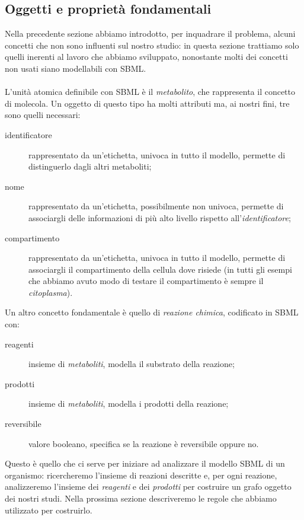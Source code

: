 \subsection{Oggetti e propriet\`a fondamentali}
\label{sec:necessaryRealObjectsModeledInSBML}

Nella precedente sezione abbiamo introdotto, per inquadrare il
problema, alcuni concetti che non sono influenti sul nostro studio: in
questa sezione trattiamo solo quelli inerenti al lavoro che abbiamo
sviluppato, nonostante molti dei concetti non usati siano modellabili
con SBML.
\\\\
L'unit\`a atomica definibile con SBML \`e il \emph{metabolito}, che
rappresenta il concetto di molecola.  Un oggetto di questo tipo ha
molti attributi ma, ai nostri fini, tre sono quelli necessari:
\begin{description}
\item[identificatore] rappresentato da un'etichetta, univoca in tutto
  il modello, permette di distinguerlo dagli altri metaboliti;
\item[nome] rappresentato da un'etichetta, possibilmente non univoca,
  permette di associargli delle informazioni di pi\`u alto livello
  rispetto all'\emph{identificatore};
\item[compartimento] rappresentato da un'etichetta, univoca in tutto
  il modello, permette di associargli il compartimento della cellula
  dove risiede (in tutti gli esempi che abbiamo avuto modo di testare
  il compartimento \`e sempre il \emph{citoplasma}).
\end{description}

Un altro concetto fondamentale \`e quello di \emph{reazione chimica},
codificato in SBML con:
\begin{description}
\item[reagenti] insieme di \emph{metaboliti}, modella il
  substrato della reazione;
\item[prodotti] insieme di \emph{metaboliti}, modella i
  prodotti della reazione;
\item[reversibile] valore booleano, specifica se la reazione \`e
  reversibile oppure no.
\end{description}
Questo \`e quello che ci serve per iniziare ad analizzare il modello
SBML di un organismo: ricercheremo l'insieme di reazioni descritte e,
per ogni reazione, analizzeremo l'insieme dei \emph{reagenti} e dei
\emph{prodotti} per costruire un grafo oggetto dei nostri studi. Nella
prossima sezione descriveremo le regole che abbiamo utilizzato per
costruirlo.

